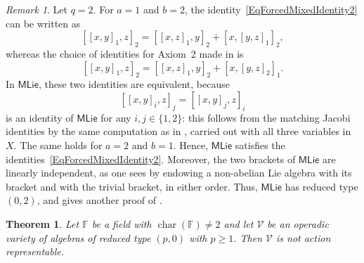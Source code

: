 \documentclass[reqno,a4paper]{amsart}
\theoremstyle{plain}
\newtheorem{theorem}[subsection]{Theorem}
\theoremstyle{definition}
\theoremstyle{remark}
\newtheorem{remark}[subsection]{Remark}
\numberwithin{equation}{section}
\newcommand{\F}{\mathbb{F}}
\newcommand{\V}{\mathcal{V}}
\DeclareMathOperator{\bchar}{char}
\newcommand{\MatchLie}{\ensuremath{\mathsf{MLie}}}
\begin{document}
\begin{remark}\label{RemarkForcedIsMatching2}
Let $q=2$. For $a=1$ and $b=2$, the identity~\eqref{EqForcedMixedIdentity2} can be written as
\[
[[x,y]_1,z]_2=[[x,z]_1,y]_2+[x,[y,z]_1]_2,
\]
whereas the choice of identities for Axiom~2 made in  is
\[
[[x,y]_1,z]_2=[[x,z]_1,y]_2+[x,[y,z]_2]_1 .
\]
In $\MatchLie$, these two identities are equivalent, because
\[
[[x,y]_i,z]_j=[[x,y]_j,z]_i
\]
is an identity of $\MatchLie$ for any $i,j\in\{1,2\}$: this follows from the matching Jacobi identities by the same computation as in , carried out with all three variables in $X$. The same holds for $a=2$ and $b=1$. Hence, $\MatchLie$ satisfies the identities~\eqref{EqForcedMixedIdentity2}. Moreover, the two brackets of $\MatchLie$ are linearly independent, as one sees by endowing a non-abelian Lie algebra with its bracket and with the trivial bracket, in either order. Thus, $\MatchLie$ has reduced type $(0,2)$, and  gives another proof of .
\end{remark}

\begin{theorem}\label{TheoremCommNotAR}
Let $\F$ be a field with $\bchar(\F)\neq2$ and let $\V$ be an operadic variety of algebras of reduced type $(p,0)$ with $p\geq1$. Then $\V$ is not action representable.
\end{theorem}
\end{document}
